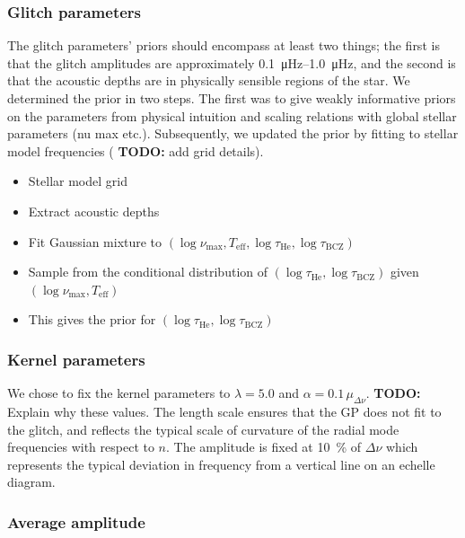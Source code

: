 \documentclass[linenumbers,modern,astrosymb,times]{aastex631}
\newcommand{\helium}{\mathrm{He}}
\newcommand{\bcz}{\mathrm{BCZ}}
\newcommand{\todo}[1]{{\color{todo} \textbf{TODO:} #1}}
\begin{document}
\subsubsection{Glitch parameters}\label{sec:glitch-params}

The glitch parameters' priors should encompass at least two things; the first is
that the glitch amplitudes are approximately \SIrange{0.1}{1.0}{\micro\hertz},
and the second is that the acoustic depths are in physically sensible regions
of the star. We determined the prior in two steps. The first was to give weakly
informative priors on the parameters from physical intuition and scaling
relations with global stellar parameters (nu max etc.). Subsequently, we
updated the prior by fitting to stellar model frequencies
(\todo{add grid details}).

\begin{itemize}
    \item Stellar model grid
    \item Extract acoustic depths
    \item Fit Gaussian mixture to \((\log\nu_\mathrm{max}, T_\mathrm{eff},
          \log\tau_\helium, \log\tau_\bcz)\)
    \item Sample from the conditional distribution of \((\log\tau_\helium,
          \log\tau_\bcz)\) given \((\log\nu_\mathrm{max}, T_\mathrm{eff})\)
    \item This gives the prior for \((\log\tau_\helium, \log\tau_\bcz)\)
\end{itemize}


\subsubsection{Kernel parameters}\label{sec:kernel-params}

We chose to fix the kernel parameters to \(\lambda = 5.0\) and \(\alpha =
0.1 \, \mu_{\Delta\nu}\). \todo{Explain why these values.} The length scale
ensures that the GP does not fit to the glitch, and reflects the typical scale
of curvature of the radial mode frequencies with respect to \(n\). The amplitude
is fixed at \SI{10}{\percent} of \(\Delta\nu\) which represents the typical
deviation in frequency from a vertical line on an echelle diagram.


\subsubsection{Average amplitude}\label{sec:avg-amp}
\end{document}
